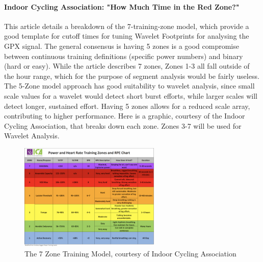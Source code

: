 \documentclass[12pt,a4paper]{report}
\begin{document}
\paragraph{Indoor Cycling Association: "How Much Time in the Red Zone?"}
This article details a breakdown of the 7-training-zone model, which provide a good template for cutoff times for tuning Wavelet Footprints for analysing the GPX signal.
The general consensus is having 5 zones is a good compromise between continuous training definitions (specific power numbers) and binary (hard or easy). While the article describes 7 zones,
Zones 1-3 all fall outside of the hour range, which for the purpose of segment analysis would be fairly useless. The 5-Zone model approach
has good suitability to wavelet analysis, since small scale values for a wavelet would detect short burst efforts, while larger scales will detect longer, sustained effort.
Having 5 zones allows for a reduced scale array, contributing to higher performance. Here is a graphic, courtesy of the Indoor Cycling Association, that breaks down each zone. Zones 3-7 will be used for Wavelet Analysis.
\begin{figure}[h!]
	\begin{center}
		\includegraphics[width=0.6\textwidth]{zones.png}
	\end{center}
	\caption{The 7 Zone Training Model, courtesy of Indoor Cycling Association}
\end{figure}
\end{document}
